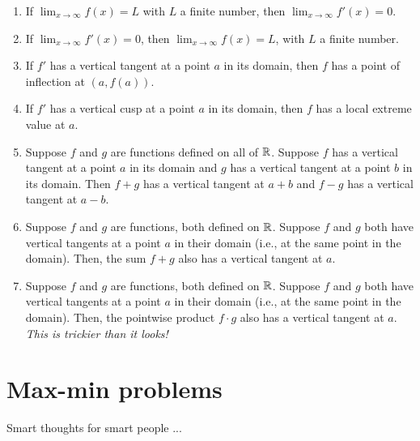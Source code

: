 \documentclass[10pt]{amsart}
\begin{document}
\begin{enumerate}
\item If $\lim_{x \to \infty} f(x) = L$ with $L$ a finite number, then
  $\lim_{x \to \infty} f'(x) = 0$.
\item If $\lim_{x \to \infty} f'(x) = 0$, then $\lim_{x \to \infty}
  f(x) = L$, with $L$ a finite number.
\item If $f'$ has a vertical tangent at a point $a$ in its domain,
  then $f$ has a point of inflection at $(a,f(a))$.
\item If $f'$ has a vertical cusp at a point $a$ in its domain, then
  $f$ has a local extreme value at $a$.
\item Suppose $f$ and $g$ are functions defined on all of
  $\mathbb{R}$. Suppose $f$ has a vertical tangent at a point $a$ in its
  domain and $g$ has a vertical tangent at a point $b$ in its
  domain. Then $f + g$ has a vertical tangent at $a + b$ and $f - g$
  has a vertical tangent at $a - b$.
\item Suppose $f$ and $g$ are functions, both defined on $\mathbb{R}$. Suppose
  $f$ and $g$ both have vertical tangents at a point $a$ in their
  domain (i.e., at the same point in the domain). Then, the sum $f +
  g$ also has a vertical tangent at $a$.
\item Suppose $f$ and $g$ are functions, both defined on $\mathbb{R}$. Suppose
  $f$ and $g$ both have vertical tangents at a point $a$ in their domain (i.e.,
  at the same point in the domain). Then, the pointwise product $f
  \cdot g$ also has a vertical tangent at $a$. {\em This is trickier
  than it looks!}
\end{enumerate}
\section{Max-min problems}

Smart thoughts for smart people ...
\end{document}
